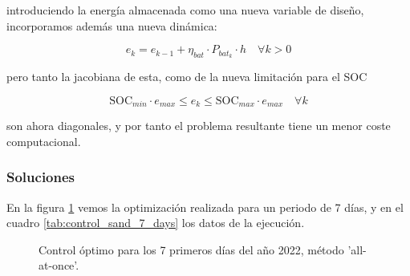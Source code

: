 introduciendo la energía almacenada como una nueva variable de diseño, incorporamos
además una nueva dinámica:

\begin{equation}
	e_k = e_{k-1} + \eta_{bat} \cdot P_{bat_k} \cdot h \quad \forall k > 0
\end{equation}

pero tanto la jacobiana de esta, como de la nueva limitación para el SOC

\begin{equation}
	\text{SOC}_{min} \cdot e_{max} \leq e_k \leq \text{SOC}_{max} \cdot e_{max} \quad \forall k
\end{equation}

son ahora diagonales, y por tanto el problema resultante tiene un menor coste
computacional.

\subsubsection{Soluciones}

En la figura \ref{fig:control_sand_7_days} vemos la optimización realizada para
un periodo de 7 días, y en el cuadro \ref{tab:control_sand_7_days} los
datos de la ejecución.

\begin{figure}[h] \centering
	\centering
	
	\caption{Control óptimo para los 7 primeros días del año 2022, método 'all-at-once'.}
	\label{fig:control_sand_7_days}
\end{figure}

